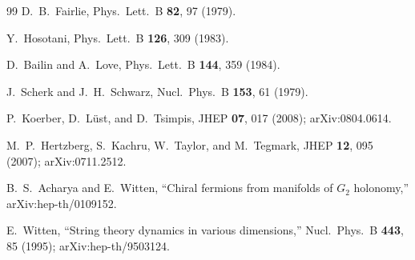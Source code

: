 \documentclass[aps,prl,twocolumn,superscriptaddress,floatfix,nofootinbib,reprint]{revtex4-2}
\newcommand{\CP}{\mathbb{CP}}
\begin{document}
\begin{thebibliography}{99}
D.~B.~Fairlie, Phys.\ Lett.\ B \textbf{82}, 97 (1979).

Y.~Hosotani, Phys.\ Lett.\ B \textbf{126}, 309 (1983).

D.~Bailin and A.~Love, Phys.\ Lett.\ B \textbf{144}, 359 (1984).

J.~Scherk and J.~H.~Schwarz, Nucl.\ Phys.\ B \textbf{153}, 61 (1979).

P.~Koerber, D.~L\"ust, and D.~Tsimpis, JHEP \textbf{07}, 017 (2008);
arXiv:0804.0614.

M.~P.~Hertzberg, S.~Kachru, W.~Taylor, and M.~Tegmark,
JHEP \textbf{12}, 095 (2007); arXiv:0711.2512.

B.~S.~Acharya and E.~Witten, ``Chiral fermions from manifolds of $G_{2}$
holonomy,'' arXiv:hep-th/0109152.

E.~Witten, ``String theory dynamics in various dimensions,'' Nucl.\ Phys.\ B
\textbf{443}, 85 (1995); arXiv:hep-th/9503124.


\end{thebibliography}
\end{document}
